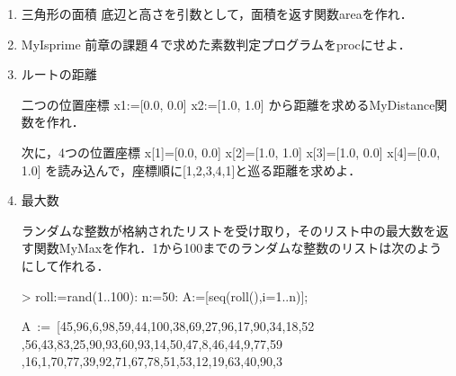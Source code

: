 \begin{enumerate}
\item 三角形の面積 
底辺と高さを引数として，面積を返す関数areaを作れ．

\item MyIsprime
前章の課題４で求めた素数判定プログラムをprocにせよ．

\item ルートの距離

二つの位置座標
x1:=[0.0, 0.0]
x2:=[1.0, 1.0]
から距離を求めるMyDistance関数を作れ．

次に，4つの位置座標
x[1]=[0.0, 0.0]
x[2]=[1.0, 1.0]
x[3]=[1.0, 0.0]
x[4]=[0.0, 1.0]
を読み込んで，座標順に[1,2,3,4,1]と巡る距離を求めよ．

\item 最大数

ランダムな整数が格納されたリストを受け取り，そのリスト中の最大数を返す関数MyMaxを作れ．1から100までのランダムな整数のリストは次のようにして作れる．
\begin{MapleInput}
> roll:=rand(1..100): 
  n:=50: 
  A:=[seq(roll(),i=1..n)];
\end{MapleInput}
\begin{MapleOutputGather}
A\, := \,[45,96,6,98,59,44,100,38,69,27,96,17,90,34,18,52 \notag \\
   ,56,43,83,25,90,93,60,93,14,50,47,8,46,44,9,77,59 \notag \\
   ,16,1,70,77,39,92,71,67,78,51,53,12,19,63,40,90,3 \notag
\end{MapleOutputGather}
\end{enumerate}
